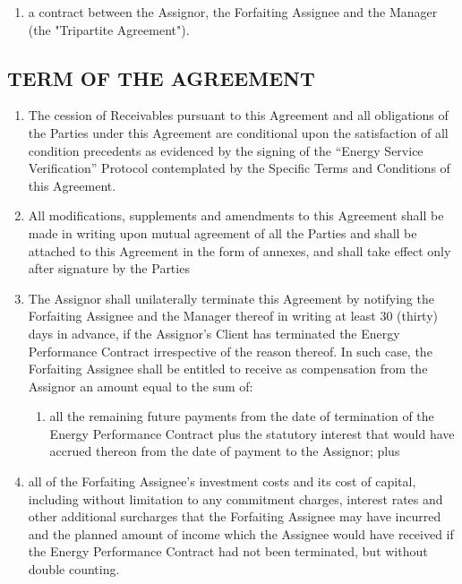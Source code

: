 \documentclass[a4paper]{article}
\begin{document}
\begin{multicols}{2}
\begin{enumerate}
\begin{enumerate}
    \item{a contract between the Assignor, the Forfaiting Assignee and
        the Manager (the "Tripartite Agreement").}
    \end{enumerate}
  \end{enumerate}

  \subsection{TERM OF THE AGREEMENT}

  \begin{enumerate}
  \item{The cession of Receivables pursuant to this Agreement and all
      obligations of the Parties under this Agreement are conditional
      upon the satisfaction of all condition precedents as evidenced
      by the signing of the “Energy Service Verification” Protocol contemplated by
      the Specific Terms and Conditions of this Agreement.}

  \item{All modifications, supplements and amendments to this
      Agreement shall be made in writing upon mutual agreement of all
      the Parties and shall be attached to this Agreement in the form
      of annexes, and shall take effect only after signature by the
      Parties }

  \item{The Assignor shall unilaterally terminate this Agreement by
      notifying the Forfaiting Assignee and the Manager thereof in
      writing at least 30 (thirty) days in advance, if the Assignor’s
      Client has terminated the Energy Performance Contract
      irrespective of the reason thereof. In such case, the Forfaiting
      Assignee shall be entitled to receive as compensation from the
      Assignor an amount equal to the sum of: }

    \begin{enumerate}
    \item{all the remaining future payments from the date of
        termination of the Energy Performance Contract plus the
        statutory interest that would have accrued thereon from the
        date of payment to the Assignor; plus}
    \end{enumerate}

  \item{all of the Forfaiting Assignee’s investment costs and its cost
      of capital, including without limitation to any commitment
      charges, interest rates and other additional surcharges that the
      Forfaiting Assignee may have incurred and the planned amount of
      income which the Assignee would have received if the Energy
      Performance Contract had not been terminated, but without double
      counting.}


\end{enumerate}
\end{multicols}
\end{document}
